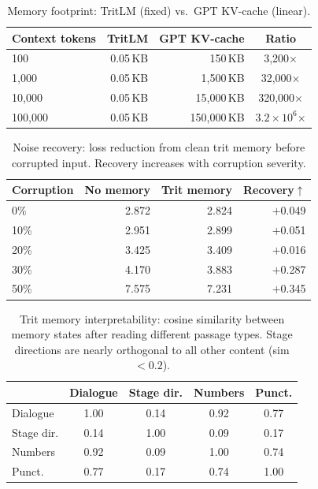 \documentclass[10pt,twocolumn]{article}
\newcommand{\tritlm}{TritLM}
\begin{document}
\begin{table}[H]
\centering\small
\caption{Memory footprint: \tritlm{} (fixed) vs.\ GPT KV-cache (linear).}
\begin{tabular}{lrrc}
\toprule
Context tokens & \tritlm{} & GPT KV-cache & Ratio \\ \midrule
100     & 0.05\,KB & 150\,KB    & 3,200$\times$ \\
1,000   & 0.05\,KB & 1,500\,KB  & 32,000$\times$ \\
10,000  & 0.05\,KB & 15,000\,KB & 320,000$\times$ \\
100,000 & 0.05\,KB & 150,000\,KB & $3.2\times10^6$$\times$ \\
\bottomrule
\end{tabular}
\end{table}

\begin{table}[H]
\centering\small
\caption{Noise recovery: loss reduction from clean trit memory
before corrupted input. Recovery increases with corruption severity.}
\begin{tabular}{lrrr}
\toprule
Corruption & No memory & Trit memory & Recovery$\uparrow$ \\ \midrule
0\%  & 2.872 & 2.824 & $+$0.049 \\
10\% & 2.951 & 2.899 & $+$0.051 \\
20\% & 3.425 & 3.409 & $+$0.016 \\
30\% & 4.170 & 3.883 & $+$0.287 \\
50\% & 7.575 & 7.231 & $+$0.345 \\
\bottomrule
\end{tabular}
\end{table}

\begin{table}[H]
\centering\small
\caption{Trit memory interpretability: cosine similarity between
memory states after reading different passage types.
Stage directions are nearly orthogonal to all other content (sim $< 0.2$).}
\begin{tabular}{lcccc}
\toprule
 & Dialogue & Stage dir. & Numbers & Punct. \\ \midrule
Dialogue    & 1.00 & 0.14 & 0.92 & 0.77 \\
Stage dir.  & 0.14 & 1.00 & 0.09 & 0.17 \\
Numbers     & 0.92 & 0.09 & 1.00 & 0.74 \\
Punct.      & 0.77 & 0.17 & 0.74 & 1.00 \\
\bottomrule
\end{tabular}
\end{table}
\end{document}
